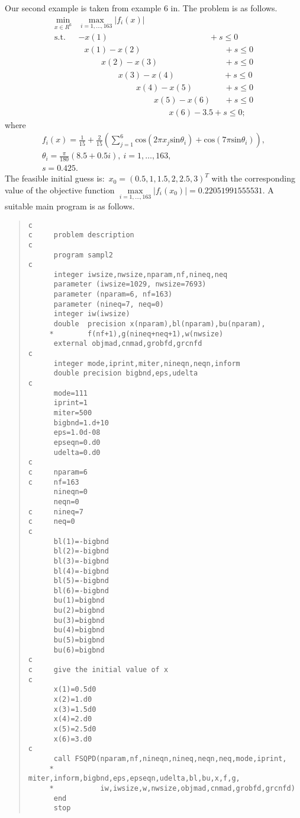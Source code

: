 Our second example is taken from example 6 
in\Lspace {}\Rcitemark \Rspace{}. The problem is as follows.
$$\begin{array}{cl}
\min\limits_{x\in R^6} & \max\limits_{i=1,\ldots,163} |f_i(x)| \\
\mbox{s.t.} & -x(1)~~~~~~\,\!~~~~~~~~~~~~~~\;
~~~~~~~~~~~~~~~~~~~~~~~~~~~~~~~~~+s \leq 0 \\
            & ~\,\,\,\!x(1)-x(2)~~~~~~~~~~~~\;
~~~~~~~~~~~~~~~~~~~~~~~~~~~~~~~~+s \leq 0 \\
            & ~~~~~~\,\!~~~~~\,x(2)-x(3)~~~~\;\,
~~~~~~~~~~~~~~~~~~~~~~~~~~~~~~+s \leq 0 \\
            & ~~~~~~~\,\!~~~~~~~~~~~~~~x(3)-x(4)
~~~~~~~~~~~~~~~~~~~~~~~~\;~+s \leq 0 \\
            & ~~~~~~~~\,\!~~~~~~~~~~~~~~~~~~~~~~\,x(4)-x(5)
~~~~~~~~~~~~~~~\;\,+s \leq 0 \\
          & ~~~~~~~~~~~\,\!~~~~~~~~~~~~~~~~~~~~~~~~~~~~\,\,x(5)-x(6)
~~~\;~~~+s \leq 0 \\
       & ~~~~~~~~~~~~~~~\,\!~~~~~~~~~~~~~~~~~~~~~~~~~~~~~~
~~~\,x(6)-3.5+s \leq 0;
\end{array}$$
where
$$\begin{array}{l}
f_i(x)=\frac{1}{15}+\frac{2}{15}(\sum^6_{j=1} 
           \mbox{cos}(2\pi x_j\mbox{sin}\theta _i)
                +\mbox{cos}(7\pi \mbox{sin}\theta _i)), \\
\theta _i=\frac{\pi}{180}(8.5+0.5i),~i=1,\ldots,163,\\
s=0.425.
\end{array}$$
The feasible initial guess is:~$x_0=(0.5,1,1.5,2,2.5,3)^T$ with
the corresponding value of the objective 
function $\max\limits_{i=1,\ldots,163} |f_i(x_0)|=0.22051991555531$. 
A suitable main program is as follows.
\begin{quote}
\begin{verbatim}
c
c     problem description
c
      program sampl2
c
      integer iwsize,nwsize,nparam,nf,nineq,neq
      parameter (iwsize=1029, nwsize=7693)
      parameter (nparam=6, nf=163)
      parameter (nineq=7, neq=0)
      integer iw(iwsize)
      double  precision x(nparam),bl(nparam),bu(nparam),
     *        f(nf+1),g(nineq+neq+1),w(nwsize)
      external objmad,cnmad,grobfd,grcnfd
c
      integer mode,iprint,miter,nineqn,neqn,inform
      double precision bigbnd,eps,udelta
c
      mode=111
      iprint=1
      miter=500
      bigbnd=1.d+10
      eps=1.0d-08
      epseqn=0.d0
      udelta=0.d0
c
c     nparam=6
c     nf=163
      nineqn=0
      neqn=0
c     nineq=7
c     neq=0
c    
      bl(1)=-bigbnd
      bl(2)=-bigbnd
      bl(3)=-bigbnd
      bl(4)=-bigbnd
      bl(5)=-bigbnd
      bl(6)=-bigbnd
      bu(1)=bigbnd
      bu(2)=bigbnd
      bu(3)=bigbnd
      bu(4)=bigbnd
      bu(5)=bigbnd
      bu(6)=bigbnd
c
c     give the initial value of x
c
      x(1)=0.5d0
      x(2)=1.d0
      x(3)=1.5d0
      x(4)=2.d0
      x(5)=2.5d0
      x(6)=3.d0
c
      call FSQPD(nparam,nf,nineqn,nineq,neqn,neq,mode,iprint,     
     *           miter,inform,bigbnd,eps,epseqn,udelta,bl,bu,x,f,g,
     *           iw,iwsize,w,nwsize,objmad,cnmad,grobfd,grcnfd)
      end
      stop
\end{verbatim}
\end{quote}

